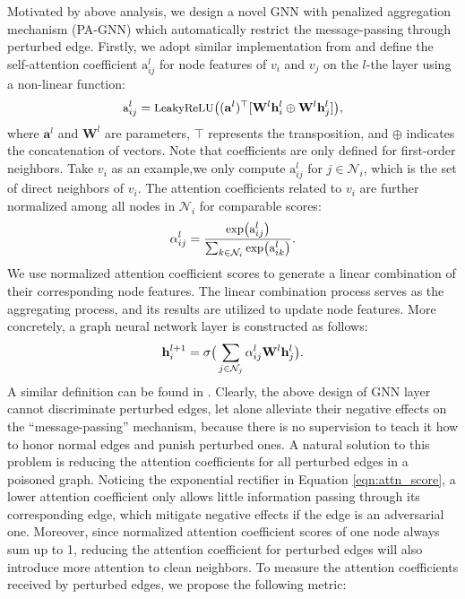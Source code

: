 \documentclass[sigconf]{acmart}
\newcommand{\ours}{{PA-GNN}\xspace}
\def \N {\mathcal{N}}
\def \h {\mathbf{h}}
\def \W {\mathbf{W}}
\def \h {\mathbf{h}}
\begin{document}
Motivated by above analysis, we design a novel GNN with penalized aggregation mechanism (\ours) which automatically restrict the message-passing through perturbed edge.
Firstly, we adopt similar implementation from \cite{vaswani2017attention} and define the self-attention coefficient $\text{a}_{ij}^l$ for node features of $v_i$ and $v_j$ on the $l$-the layer using a non-linear function:
\begin{equation}
\small\label{eqn:attn_coef}
    \text{a}_{ij}^l =
    \text{LeakyReLU} \big ( (\mathbf{a}^l)^\top [\W^l \h_i^l \oplus \W^l \h_j^l] \big ),
\end{equation}
where $\mathbf{a}^l$ and $\W^l$ are parameters, $\top$ represents the transposition, and $\oplus$ indicates the concatenation of vectors.
Note that coefficients are only defined for first-order neighbors. 
Take $v_i$ as an example,we only compute $\text{a}_{ij}^l$ for $j \in \N_i$, which is the set of direct neighbors of $v_i$. The attention coefficients related to $v_i$ are further normalized among all nodes in $\N_i$ for comparable scores:
\begin{equation}
\small
\label{eqn:attn_score}
    \alpha_{ij}^l = \frac{
    \text{exp}\big (\text{a}_{ij}^l \big )
    }{\sum_{k\in\N_i}
    \text{exp}\big (\text{a}_{ik}^l \big )
    }.
\end{equation}
We use normalized attention coefficient scores to generate a linear combination of their corresponding node features. The linear combination process serves as the aggregating process, and its results are utilized to update node features.
More concretely, a graph neural network layer is constructed as follows:
\begin{equation} 
\small\label{eqn:gat}
    \h_i^{l+1} = \sigma \big ( \sum_{j\in \N_j} \alpha_{ij}^{l}  \W^{l} \h_j^{l} \big ).
\end{equation}
A similar definition can be found in \cite{velivckovic2017graph}.
Clearly, the above design of GNN layer cannot discriminate perturbed edges, let alone alleviate their negative effects on the ``message-passing'' mechanism, because there is no supervision to teach it how to honor normal edges and punish perturbed ones.
A natural solution to this problem is reducing the attention coefficients for all perturbed edges in a poisoned graph. Noticing the exponential rectifier in Equation \ref{eqn:attn_score}, a lower attention coefficient only allows little information passing through its corresponding edge, which mitigate negative effects if the edge is an adversarial one. Moreover, since normalized attention coefficient scores of one node always sum up to 1, reducing the attention coefficient for perturbed edges will also introduce more attention to clean neighbors. To measure the attention coefficients received by perturbed edges, we propose the following metric:
\end{document}
